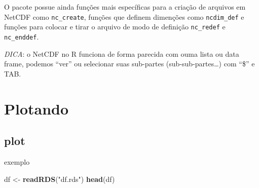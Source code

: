 \documentclass[]{book}
\newenvironment{Shaded}{\begin{snugshade}}{\end{snugshade}}
\newcommand{\KeywordTok}[1]{\textcolor[rgb]{0.13,0.29,0.53}{\textbf{#1}}}
\newcommand{\StringTok}[1]{\textcolor[rgb]{0.31,0.60,0.02}{#1}}
\newcommand{\NormalTok}[1]{#1}
\begin{document}
O pacote possue ainda funções mais específicas para a criação de
arquivos em NetCDF como \texttt{nc\_create}, funções que definem
dimenções como \texttt{ncdim\_def} e funções para colocar e tirar o
arquivo de modo de definição \texttt{nc\_redef} e \texttt{nc\_enddef}.

\emph{DICA}: o NetCDF no R funciona de forma parecida com ouma lista ou
data frame, podemos ``ver'' ou selecionar suas sub-partes
(sub-sub-partes\ldots{}) com ``\$'' e TAB.

\chapter{Plotando}\label{plotando}

\section{plot}\label{plot}

exemplo

\begin{Shaded}
\begin{Highlighting}[]
\NormalTok{df <-}\StringTok{ }\KeywordTok{readRDS}\NormalTok{(}\StringTok{"df.rds"}\NormalTok{)}
\KeywordTok{head}\NormalTok{(df)}
\end{Highlighting}
\end{Shaded}
\end{document}
